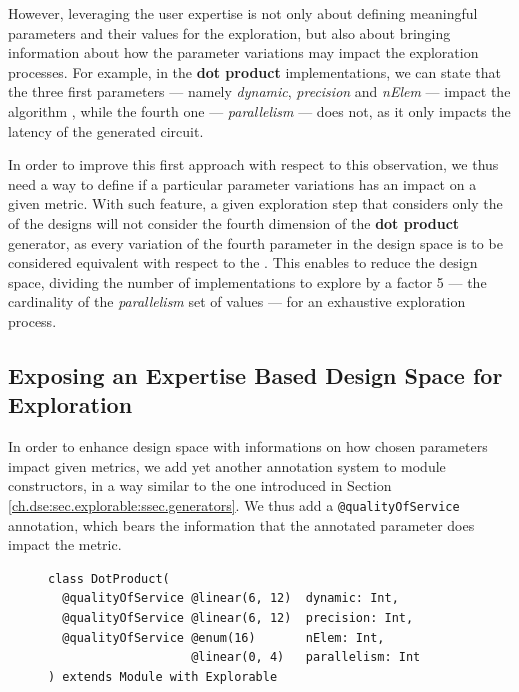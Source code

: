         However, leveraging the user expertise is not only about defining meaningful parameters and their values for the exploration, but also about bringing information about how the parameter variations may impact the exploration processes.
        For example, in the {\bf dot product} implementations, we can state that the three first parameters --- namely {\it dynamic}, {\it precision} and {\it nElem} --- impact the algorithm , while the fourth one --- {\it parallelism} --- does not, as it only impacts the latency of the generated circuit.

        In order to improve this first approach with respect to this observation, we thus need a way to define if a particular parameter variations has an impact on a given metric.
        With such feature, a given exploration step that considers only the  of the designs will not consider the fourth dimension of the {\bf dot product} generator, as every variation of the fourth parameter in the design space is to be considered equivalent with respect to the .
        This enables to reduce the design space, dividing the number of implementations to explore by a factor 5 --- the cardinality of the {\it parallelism} set of values --- for an exhaustive exploration process.

    \subsection[Exposing an Expertised Based Design Space]{Exposing an Expertise Based Design Space for Exploration}
    \label{ch.dse:sec.explorable:ssec.space}

        In order to enhance design space with informations on how chosen parameters impact given metrics, we add yet another annotation system to module constructors, in a way similar to the one introduced in Section \ref{ch.dse:sec.explorable:ssec.generators}.
        We thus add a \lstinline{@qualityOfService} annotation, which bears the information that the annotated parameter does impact the  metric.

            \begin{figure}[h!]
                \vspace{-0.2cm}
                \begin{lstlisting}[xleftmargin=0mm,
                                   caption={[Enhancing the dot product design space]Enhancing the dot product design space with quality of service\newline concerns},
                                   label={ch.dse:sec.explorable:ssec.space:list.dotproduct}]
class DotProduct(
  @qualityOfService @linear(6, 12)  dynamic: Int,
  @qualityOfService @linear(6, 12)  precision: Int,
  @qualityOfService @enum(16)       nElem: Int,
                    @linear(0, 4)   parallelism: Int
) extends Module with Explorable\end{lstlisting}
                \vspace{-0.5cm}
            \end{figure}

